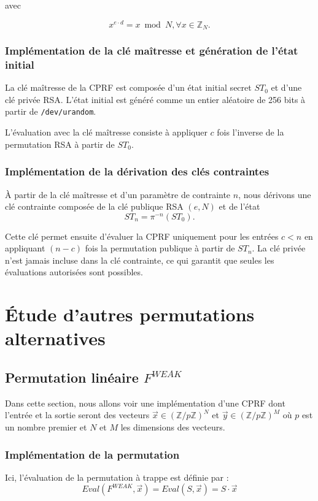 \documentclass[9pt]{extarticle}
\begin{document}
avec 

\[
x^{e \cdot d} = x \bmod N , \forall x \in \mathbb{Z}_N.
\] 

\newpage
\subsubsection{Implémentation de la clé maîtresse et génération de l’état initial}

La clé maîtresse de la CPRF est composée d’un état initial secret $ST_0$ et d’une clé
privée RSA. L’état initial est généré comme un entier aléatoire de 256 bits à partir de
\texttt{/dev/urandom}.

L’évaluation avec la clé maîtresse consiste à appliquer $c$ fois l’inverse de la permutation
RSA à partir de $ST_0$.

\subsubsection{Implémentation de la dérivation des clés contraintes}

À partir de la clé maîtresse et d’un paramètre de contrainte $n$, nous dérivons une clé
contrainte composée de la clé publique RSA $(e, N)$ et de l’état
\[
ST_n = \pi^{-n}(ST_0).
\]

Cette clé permet ensuite d’évaluer la CPRF uniquement pour les entrées $c < n$ en
appliquant $(n-c)$ fois la permutation publique à partir de $ST_n$. La clé privée n’est
jamais incluse dans la clé contrainte, ce qui garantit que seules les évaluations autorisées
sont possibles.


\section{Étude d'autres permutations alternatives}
\subsection{Permutation linéaire $F^{WEAK}$}

Dans cette section, nous allons voir une implémentation d'une CPRF dont l'entrée et la sortie seront des vecteurs $\vec{x} \in (\mathbb{Z}/p\mathbb{Z})^N $ et $\vec{y} \in (\mathbb{Z}/p\mathbb{Z})^M$ où $p$ est un nombre premier et $N$ et $M$ les dimensions des vecteurs.

\subsubsection{Implémentation de la permutation}
Ici, l'évaluation de la permutation à trappe est définie par :
\[Eval(F^{WEAK},\vec{x}) = Eval(S,\vec{x}) = S \cdot \vec{x}\] 
\end{document}
